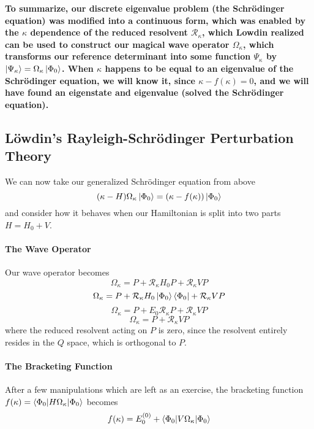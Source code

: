 \documentclass{article}
\newcommand{\Ezero}{E^{(0)}}
\begin{document}
\textbf{
To summarize, our discrete eigenvalue problem (the Schr{\"o}dinger equation) 
was modified into a continuous form, which was enabled by the $\kappa$ dependence of the
reduced resolvent $\mathcal{R}_\kappa$, which Lowdin realized can be used to construct our magical wave operator $\Omega_\kappa$, which
transforms our reference determinant into some function $\Psi_\kappa$ by $ \ket{\Psi_\kappa} = \Omega_\kappa \ket{\Phi_0}$.
When $\kappa$ happens to be equal to an eigenvalue of the Schr{\"o}dinger equation,
we will know it, since $\kappa - f(\kappa) = 0$, and we will have found an eigenstate and eigenvalue (solved the Schr{\"o}dinger equation).
}

\subsection{L{\"o}wdin's Rayleigh-Schr{\"o}dinger Perturbation Theory}
We can now take our generalized Schr{\"o}dinger equation from above 
\[ (\kappa - H) \Omega_\kappa \ket{\Phi_0} = (\kappa - f(\kappa)) \ket{\Phi_0} \]
and consider how it behaves when our Hamiltonian is split into two parts $H = H_0 + V$. 

\paragraph{\textbf{The Wave Operator}}
Our wave operator becomes
\[\Omega_\kappa = P + \mathcal{R}_{\kappa} H_0 P + \mathcal{R}_{\kappa} V P \]
\[\Omega_\kappa = P + \mathcal{R}_{\kappa} H_0 \ket{\Phi_0}\bra{\Phi_0} + \mathcal{R}_{\kappa} V P \]
\[\Omega_\kappa = P + E_0 \mathcal{R}_{\kappa} P + \mathcal{R}_{\kappa} V P \]
\[\Omega_\kappa = P + \mathcal{R}_{\kappa} V P \]
where the reduced resolvent acting on $P$ is zero, since the resolvent entirely resides in the $Q$ space, which is orthogonal to $P$.

\paragraph{\textbf{The Bracketing Function}}
After a few manipulations which are left as an exercise, 
the bracketing function $f(\kappa) = \braket{\Phi_0 | H \Omega_\kappa | \Phi_0}$ becomes 
\[f(\kappa) = \Ezero_0 + \braket{\Phi_0 | V \Omega_\kappa | \Phi_0 } \]
\end{document}
